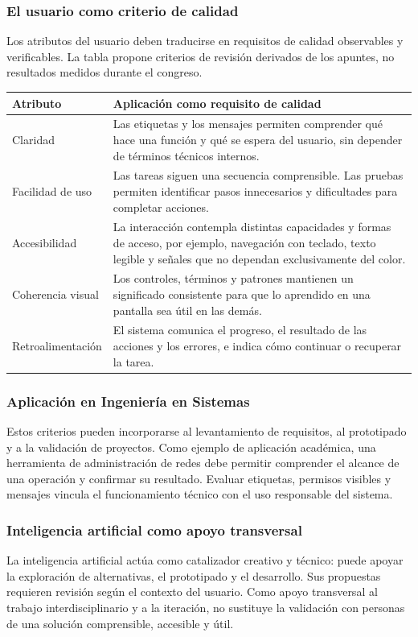 \clearpage
\subsubsection*{\textcolor{unabblue}{\faCheckCircle}\quad El usuario como criterio de calidad}
Los atributos del usuario deben traducirse en requisitos de calidad observables
y verificables. La tabla propone criterios de revisión derivados de los apuntes,
no resultados medidos durante el congreso.

\begingroup
\small
\renewcommand{\arraystretch}{1.2}
\begin{tabularx}{\linewidth}{@{}p{3.2cm}X@{}}
\toprule
\textbf{Atributo} & \textbf{Aplicación como requisito de calidad} \\
\midrule
Claridad & Las etiquetas y los mensajes permiten comprender qué hace una
función y qué se espera del usuario, sin depender de términos técnicos internos. \\
Facilidad de uso & Las tareas siguen una secuencia comprensible. Las pruebas
permiten identificar pasos innecesarios y dificultades para completar acciones. \\
Accesibilidad & La interacción contempla distintas capacidades y formas de
acceso, por ejemplo, navegación con teclado, texto legible y señales que no
dependan exclusivamente del color. \\
Coherencia visual & Los controles, términos y patrones mantienen un significado
consistente para que lo aprendido en una pantalla sea útil en las demás. \\
Retroalimentación & El sistema comunica el progreso, el resultado de las
acciones y los errores, e indica cómo continuar o recuperar la tarea. \\
\bottomrule
\end{tabularx}
\endgroup

\subsubsection*{\textcolor{unabblue}{\faLaptopCode}\quad Aplicación en Ingeniería en Sistemas}
Estos criterios pueden incorporarse al levantamiento de requisitos, al prototipado
y a la validación de proyectos. Como ejemplo de aplicación académica, una
herramienta de administración de redes debe permitir comprender el alcance
de una operación y confirmar su resultado. Evaluar etiquetas, permisos visibles
y mensajes vincula el funcionamiento técnico con el uso responsable del sistema.

\subsubsection*{\textcolor{unabblue}{\faRobot}\quad Inteligencia artificial como apoyo transversal}
La inteligencia artificial actúa como catalizador creativo y técnico: puede
apoyar la exploración de alternativas, el prototipado y el desarrollo. Sus
propuestas requieren revisión según el contexto del usuario. Como apoyo
transversal al trabajo interdisciplinario y a la iteración, no sustituye la
validación con personas de una solución comprensible, accesible y útil.
